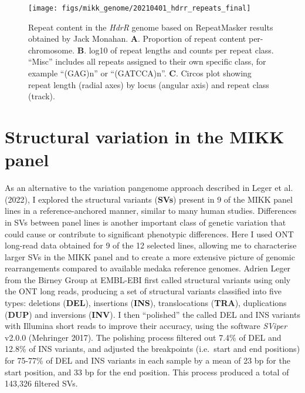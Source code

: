 \documentclass[
]{book}
\begin{document}
\begin{figure}
\texttt{[image: figs/mikk\_genome/20210401\_hdrr\_repeats\_final]} \caption{Repeat content in the \emph{HdrR} genome based on RepeatMasker results obtained by Jack Monahan. \textbf{A}. Proportion of repeat content per-chromosome. \textbf{B}. log10 of repeat lengths and counts per repeat class. ``Misc'' includes all repeats assigned to their own specific class, for example ``(GAG)n'' or ``(GATCCA)n''. \textbf{C}. Circos plot showing repeat length (radial axes) by locus (angular axis) and repeat class (track).}\label{fig:repeats}
\end{figure}

\hypertarget{mikksv-sec}{%
\section{Structural variation in the MIKK panel}\label{mikksv-sec}}

As an alternative to the variation pangenome approach described in Leger et al. (2022), I explored the structural variants (\textbf{SVs}) present in 9 of the MIKK panel lines in a reference-anchored manner, similar to many human studies. Differences in SVs between panel lines is another important class of genetic variation that could cause or contribute to significant phenotypic differences. Here I used ONT long-read data obtained for 9 of the 12 selected lines, allowing me to characterise larger SVs in the MIKK panel and to create a more extensive picture of genomic rearrangements compared to available medaka reference genomes. Adrien Leger from the Birney Group at EMBL-EBI first called structural variants using only the ONT long reads, producing a set of structural variants classified into five types: deletions (\textbf{DEL}), insertions (\textbf{INS}), translocations (\textbf{TRA}), duplications (\textbf{DUP}) and inversions (\textbf{INV}). I then ``polished'' the called DEL and INS variants with Illumina short reads to improve their accuracy, using the software \emph{SViper} v2.0.0 (Mehringer 2017). The polishing process filtered out 7.4\% of DEL and 12.8\% of INS variants, and adjusted the breakpoints (i.e.~start and end positions) for 75-77\% of DEL and INS variants in each sample by a mean of 23 bp for the start position, and 33 bp for the end position. This process produced a total of 143,326 filtered SVs.
\end{document}
